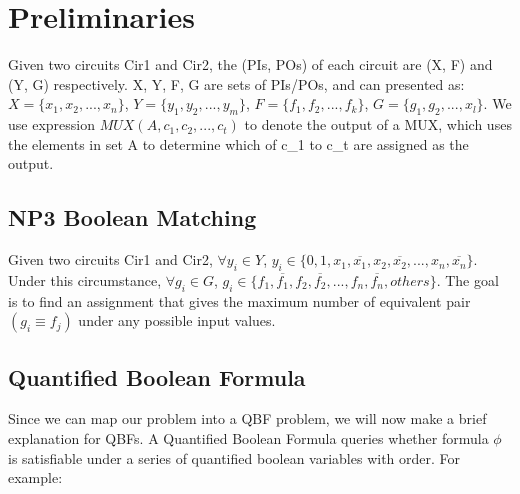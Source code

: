 \section{Preliminaries}
Given two circuits Cir1 and Cir2, the (PIs, POs) of each circuit are (X, F) and (Y, G) respectively. X, Y, F, G are sets of PIs/POs, and can presented as: $X = \{x_1, x_2, ... , x_n\}$, $Y = \{y_1, y_2, ... , y_m\}$, $F = \{f_1, f_2, ... , f_k\}$, $G = \{g_1, g_2, ... , x_l\}$. We use expression $MUX(A, c_1, c_2, ... ,c_t)$ to denote the output of a MUX, which uses the elements in set A to determine which of c\_1 to c\_t are assigned as the output.


\subsection{NP3 Boolean Matching}
Given two circuits Cir1 and Cir2, $\forall y_i \in Y$, $ y_i \in \{0, 1, x_1, \overline{x_1}, x_2, \overline{x_2}, ... , x_n, \overline{x_n}\}$. Under this circumstance, $\forall g_i \in G$, $g_i \in \{f_1, \overline{f_1}, f_2, \overline{f_2}, ... , f_n, \overline{f_n}, others\}$. The goal is to find an assignment that gives the maximum number of equivalent pair $(g_i \equiv f_j)$ under any possible input values.

\subsection{Quantified Boolean Formula}
Since we can map our problem into a QBF problem, we will now make a brief explanation for QBFs. A Quantified Boolean Formula queries whether formula $\phi$ is satisfiable under a series of quantified boolean variables with order. For example: 

